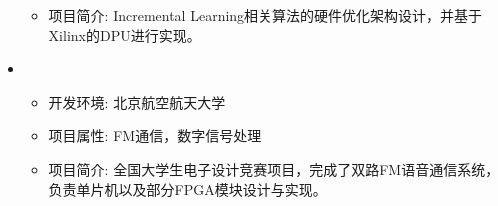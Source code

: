 \begin{itemize}[leftmargin=*]
{\begin{itemize}
      \item 项目简介: Incremental Learning相关算法的硬件优化架构设计，并基于Xilinx的DPU进行实现。
    \end{itemize}
    }\item
    {\small
    \begin{itemize}
      \item 开发环境: 北京航空航天大学
      \item 项目属性: FM通信，数字信号处理
      \item 项目简介: 全国大学生电子设计竞赛项目，完成了双路FM语音通信系统，负责单片机以及部分FPGA模块设计与实现。
    \end{itemize}
    }

  \end{itemize}